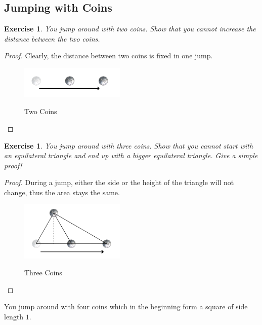 \documentclass[12pt,a4]{article}
\theoremstyle{exercise}
\newtheorem{exercise}[theorem]{Exercise}
\begin{document}
\subsection{Jumping with Coins}

\begin{exercise}
    You jump around with two coins.
    Show that you cannot increase the distance between the two coins.
\end{exercise}

\begin{proof}
    Clearly, the distance between two coins is fixed in one jump.

    \begin{figure}[H]
        \small
        \centering
        \includegraphics[width=5cm]{twocoins.png}
        \label{fig:twoCoins}
        \caption{Two Coins}
    \end{figure}

\end{proof}


\begin{exercise}
    You jump around with three coins.
    Show that you cannot start with an equilateral triangle and end up with a bigger equilateral triangle.
    Give a simple proof!
\end{exercise}

\begin{proof}
    During a jump, either the side or the height of the triangle will not change, thus the area stays the same.

    \begin{figure}[H]
        \small
        \centering
        \includegraphics[width=5cm]{threecoins.png}
        \label{fig:threeCoins}
        \caption{Three Coins}
    \end{figure}

\end{proof}

You jump around with four coins which in the beginning form a square of side length $1$.
\end{document}
